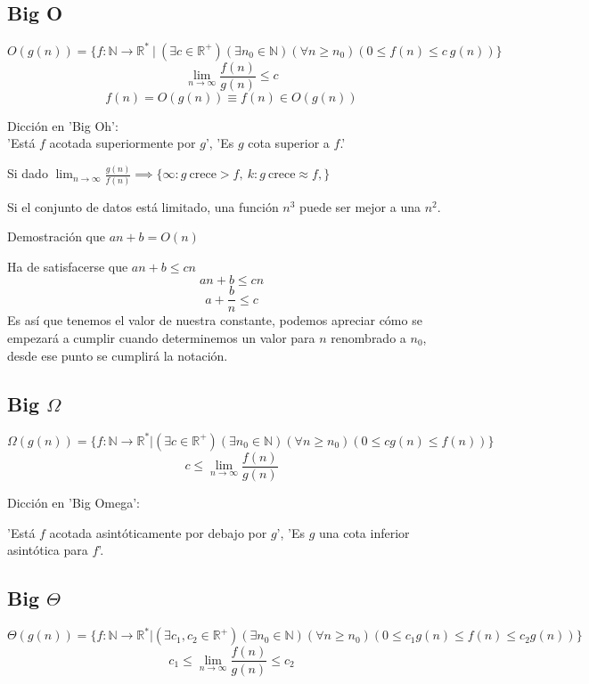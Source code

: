 \documentclass[tikz,11pt,fleqn]{book} %
\begin{document}
\subsection{Big O}
\begin{definition}$$
		O(g(n))
		=\{
		f: \mathbb N\to \mathbb R^*~|~(\exists c\in \mathbb R^+)
		(\exists n_0\in \mathbb N)
		(\forall n\ge n_0)
		(0\le f(n)\le c~g(n))
		\}
	$$
	$$
		\lim_{n\to\infty}\frac{f(n)}{g(n)}\leq c
	$$$$
		f(n)=O(g(n))\equiv f(n)\in O(g(n))
	$$
\end{definition}
\begin{remark}Dicción en 'Big Oh':\\
	'Está $f$ acotada superiormente por $g$', 'Es $g$ cota superior a $f$.'
\end{remark}

Si dado $\lim_{n\to\infty}\frac{g(n)}{f(n)}\implies\{\infty: g~\text{crece} > f,~k:g~\text{crece} \approx f,\}$

Si el conjunto de datos está limitado, una función $n^3$ puede ser mejor a una $n^2$.

\begin{example}
	Demostración que $an+b=O(n)$

	Ha de satisfacerse que $an+b\le cn$
	$$
		an+b\le cn      $$$$
		a+\frac bn\le c
	$$
	Es así que tenemos el valor de nuestra constante, podemos apreciar cómo se empezará a cumplir cuando determinemos un valor para $n$ renombrado a $n_0$, desde ese punto se cumplirá la notación.
\end{example}


\subsection{Big $\Omega$}
\begin{definition}$$
		\Omega(g(n)) =\{ f: \mathbb N \to \mathbb R^*  | (\exists c\in \mathbb R^+) (\exists n_0\in \mathbb N) (\forall n\ge n_0) ( 0\le cg(n) \le   f(n) ) \}
	$$$$
		c\le\lim_{n\to\infty}\frac{f(n)}{g(n)}
	$$\end{definition}


\begin{remark}Dicción en 'Big Omega':

	'Está $f$ acotada asintóticamente por debajo por $g$', 'Es $g$ una cota inferior asintótica para $f$'.
\end{remark}


\subsection{Big $\Theta$}
\begin{definition}
	$$
		\Theta   (g(n)) =\{ f : \mathbb N \to \mathbb R^* | (\exists c_1, c_2 \in \mathbb R^+) ( \exists n_0\in \mathbb N) (\forall n \ge n_0) (0\le c_1 g(n) \le f(n) \le c_2 g(n)) \}
	$$$$
		c_1\le\lim_{n\to\infty}\frac{f(n)}{g(n)}\le c_2
	$$\end{definition}
\end{document}
